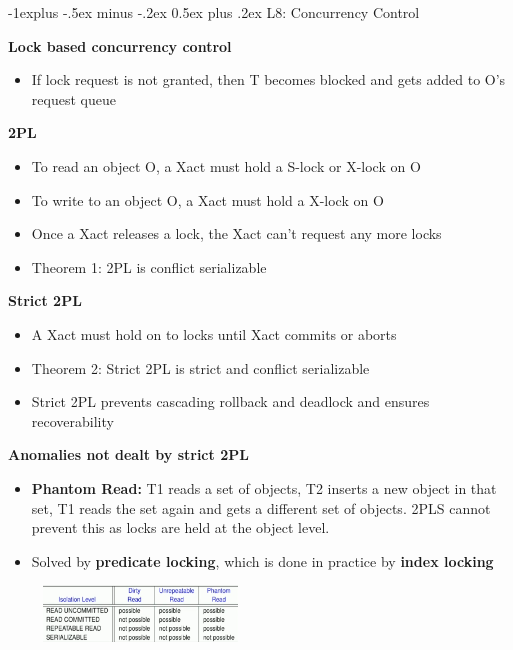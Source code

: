 \documentclass[10pt, landscape]{article}
\makeatletter
\renewcommand{\subsection}{\@startsection{subsection}{2}{0mm}%
                                {-1explus -.5ex minus -.2ex}%
                                {0.5ex plus .2ex}%
                                {\normalfont\normalsize\bfseries}}
\makeatother
\begin{document}
\begin{multicols}{4}
\subsection{L8: Concurrency Control}

\textbf{Lock based concurrency control} \\ 
\begin{itemize}
  \item If lock request is not granted, then T becomes blocked and gets added to O's request queue
\end{itemize}

\textbf{2PL} \\
\begin{itemize} 
  \item To read an object O, a Xact must hold a S-lock or X-lock on O 
  \item To write to an object O, a Xact must hold a X-lock on O 
  \item Once a Xact releases a lock, the Xact can't request any more locks
  \item Theorem 1: 2PL is conflict serializable
\end{itemize}

\textbf{Strict 2PL} \\
\begin{itemize}
  \item A Xact must hold on to locks until Xact commits or aborts
  \item Theorem 2: Strict 2PL is strict and conflict serializable
  \item Strict 2PL prevents cascading rollback and deadlock and ensures recoverability
\end{itemize}

\textbf{Anomalies not dealt by strict 2PL} \\
\begin{itemize}
  \item \textbf{Phantom Read:} T1 reads a set of objects, T2 inserts a new object in that set, T1 reads the set again and gets a different set of objects. 2PLS cannot prevent this as locks are held at the object level.
  \item Solved by \textbf{predicate locking}, which is done in practice by \textbf{index locking}
\end{itemize}
\includegraphics[width=7cm, height =1.5cm]{ansi_iso.png}


\end{multicols}
\end{document}
